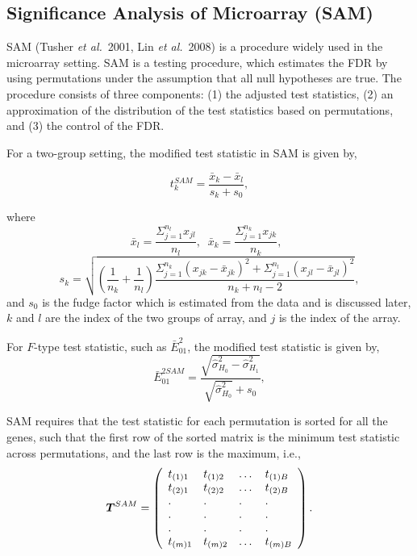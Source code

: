 \documentclass[10pt]{article}
\newcommand{\T}{\mbox{\boldmath $T$}}
\begin{document}
\subsection{Significance Analysis of Microarray (SAM)}

SAM (Tusher \textit{et al.}\ 2001, Lin \textit{et al.}\ 2008) is a procedure widely used in the
microarray setting. SAM is a testing procedure, which estimates the
FDR by using permutations under the assumption that all null
hypotheses are true. The procedure consists of three components: (1)
the adjusted test statistics, (2) an approximation of the
distribution of the test statistics based on permutations, and (3)
the control of the FDR.

For a two-group setting, the modified test statistic in SAM is given
by,

\begin{equation}
t_{k}^{SAM}= \frac{\bar{x}_{k}-\bar{x}_{l}} {s_{k}+s_{0}},
\label{ttestSAM}
\end{equation}

where \[ \bar{x}_{l}=\frac{\Sigma_{j=1}^{n_{l}} x_{jl}}{n_{l}},\;\;
\bar{x}_{k}=\frac{\Sigma_{j=1}^{n_{k}} x_{jk}}{n_{k}},\;\;\]
\[s_{k}=\sqrt{\left (\frac{1}{n_{k}}+\frac{1}{n_{l}} \right )
{\frac{\Sigma_{j=1}^{n_{k}}
   (x_{jk}-\bar{x}_{jk})^2+\Sigma_{j=1}^{n_{l}}
   (x_{jl}-\bar{x}_{jl})^2}{n_{k}+n_{l}-2}}},
   \]
and $s_0$ is the fudge factor which is estimated from the data and
is discussed later, $k$ and $l$ are the index of the two groups of
array, and $j$ is the index of the array.

For $F$-type test statistic, such as $\bar{E}_{01}^2$, the modified test
statistic is given by,
\begin{equation}
\bar{E}_{01}^{2SAM}= \frac{\sqrt{\hat{\sigma}^2_{H_0}-\hat{\sigma}^2_{H_1}}} {\sqrt{\hat{\sigma}^2_{H_0}}+s_{0}},
\label{ttestSAM}
\end{equation}






SAM requires that the test statistic for each permutation is sorted
for all the genes, such that the first row of the sorted matrix is
the minimum test statistic across permutations, and the last row is
the maximum, i.e.,
\[\T^{SAM}= \left (
\begin{array}{llll}
t_{(1)1} & t_{(1)2} & \dots & t_{(1)B}\\
t_{(2)1} & t_{(2)2} & \dots & t_{(2)B}\\
.    & .    &.      & .     \\
.    & .    &.      & .     \\
.    & .    &.      & .     \\
t_{(m)1} & t_{(m)2} & \dots & t_{(m)B}\\
\end{array}
\right ).
\]
\end{document}
